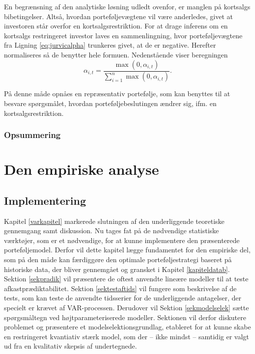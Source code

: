 \documentclass[
  a4paper,
  oneside]{memoir}
\begin{document}
En begrænsning af den analytiske løsning udledt ovenfor, er manglen på kortsalgs bibetingelser. Altså, hvordan porteføljevægtene vil være anderledes, givet at investoren står overfor en kortsalgsrestriktion. For at drage inferens om en kortsalgs restringeret investor laves en sammenlingning, hvor porteføljevægtene fra Ligning \eqref{eq:jurvicalpha} trunkeres givet, at de er negative. Herefter normaliseres så de benytter hele formuen. Nedenstående viser beregningen
\begin{equation}
\alpha_{i,t}=\frac{\max(0,\alpha_{i,t})}{\sum_{i=1}^n \max(0,\alpha_{i,t})}.\label{eq:kortsalgsrestr}
\end{equation}

På denne måde opnåes en repræsentativ portefølje, som kan benyttes til at besvare spørgsmålet, hvordan porteføljebeslutingen ændrer sig, ifm. en kortsalgsrestriktion.

\hypertarget{opsummering-1}{%
\section{Opsummering}\label{opsummering-1}}

\part{Den empiriske analyse}

\hypertarget{imple}{%
\chapter{Implementering}\label{imple}}

Kapitel \ref{varkapitel} markerede slutningen af den underliggende teoretiske gennemgang samt diskussion. Nu tages fat på de nødvendige statistiske værktøjer, som er et nødvendige, for at kunne implementere den præsenterede porteføljemodel. Derfor vil dette kapitel lægge fundamentet for den empiriske del, som på den måde kan færdiggøre den optimale porteføljestrategi baseret på historiske data, der bliver gennemgået og gransket i Kapitel \ref{kapiteldatab}. Sektion \ref{sekpradik} vil præsentere de oftest anvendte lineære modeller til at teste afkastprædiktabilitet. Sektion \ref{sektestaftids} vil fungere som beskrivelse af de tests, som kan teste de anvendte tidsserier for de underliggende antagelser, der specielt er krævet af VAR-processen. Derudover vil Sektion \ref{sekmodelselek} sætte spørgsmåltegn ved højtparameteriserede modeller. Sektionen vil derfor diskutere problemet og præsentere et modelselektionsgrundlag, etableret for at kunne skabe en restringeret kvantiativ stærk model, som der -- ikke mindst -- samtidig er valgt ud fra en kvalitativ skepsis af undertegnede.
\end{document}
